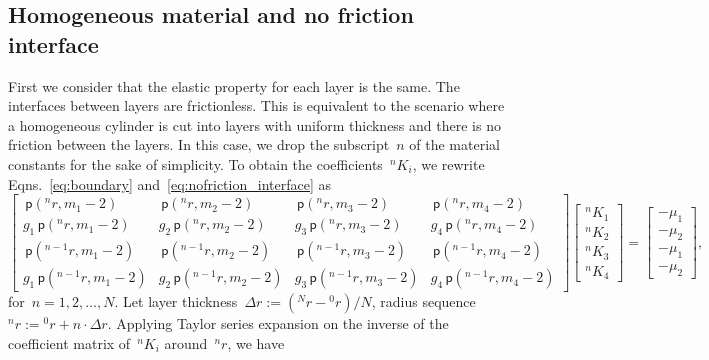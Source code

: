 \documentclass[preprint,10pt,times]{elsarticle}
\numberwithin{equation}{section}
\newcommand{\pr}[1]{\left( #1 \right)}
\newcommand{\p}{\,\mathsf{p}}
\renewcommand{\>}{$\Rightarrow$}
\begin{document}
\subsection{Homogeneous material and no friction interface}
\label{sec:1mat_no_friction}

First we consider that the elastic property for each layer is the same. The interfaces between layers are frictionless. This is equivalent to the scenario where a homogeneous cylinder is cut into layers with uniform thickness and there is no friction between the layers. In this case, we drop the subscript~$n$ of the material constants for the sake of simplicity. To obtain the coefficients~${}^{n}\!{K_{i}}$, we rewrite Eqns.~\eqref{eq:boundary} and~\eqref{eq:nofriction_interface} as
\begin{equation}
	\begin{bmatrix}
	\p\pr{{}^{n}\!{r},m_1 - 2} & \p\pr{{}^{n}\!{r},m_2 - 2} & \p\pr{{}^{n}\!{r},m_3 - 2} & \p\pr{{}^{n}\!{r},m_4 - 2} \\
	g_1 \p\pr{{}^{n}\!{r},m_1 - 2} & g_2 \p\pr{{}^{n}\!{r},m_2 - 2} & g_3 \p\pr{{}^{n}\!{r},m_3 - 2} & g_4 \p\pr{{}^{n}\!{r},m_4 - 2} \\
	\p\pr{{}^{n-1}\!{r},m_1 - 2} & \p\pr{{}^{n-1}\!{r},m_2 - 2} & \p\pr{{}^{n-1}\!{r},m_3 - 2} & \p\pr{{}^{n-1}\!{r},m_4 - 2} \\
	g_1 \p\pr{{}^{n-1}\!{r},m_1 - 2} & g_2 \p\pr{{}^{n-1}\!{r},m_2 - 2} & g_3 \p\pr{{}^{n-1}\!{r},m_3 - 2} & g_4 \p\pr{{}^{n-1}\!{r},m_4 - 2}
	\end{bmatrix}
	\begin{bmatrix}
	{}^{n}\!{K_{1}} \\ {}^{n}\!{K_{2}} \\ {}^{n}\!{K_{3}} \\ {}^{n}\!{K_{4}}
	\end{bmatrix}
	=
	\begin{bmatrix}
	-\mu_1 \\ -\mu_2 \\ -\mu_1 \\ -\mu_2
	\end{bmatrix},
	\label{eq:eqs of Kin_one_mat_no_friction}
\end{equation}
for~$n = 1,2,\dots,N$. Let layer thickness~$\Delta r := \pr{{}^{N}\!{r}-{}^{0}\!{r}}/N$, radius sequence~${}^{n}\!{r} := {}^{0}\!{r} + n\cdot \Delta r$. Applying Taylor series expansion on the inverse of the coefficient matrix of~${}^{n}\!{K_{i}}$ around~${}^{n}\!{r}$, we have
\end{document}
